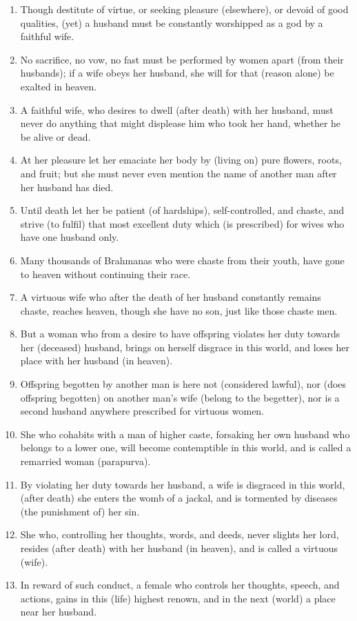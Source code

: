 \begin{enumerate}
\item Though destitute of virtue, or seeking pleasure (elsewhere), or devoid of good qualities, (yet) a husband must be constantly worshipped as a god by a faithful wife.
\item No sacrifice, no vow, no fast must be performed by women apart (from their husbands); if a wife obeys her husband, she will for that (reason alone) be exalted in heaven.
\item A faithful wife, who desires to dwell (after death) with her husband, must never do anything that might displease him who took her hand, whether he be alive or dead.
\item At her pleasure let her emaciate her body by (living on) pure flowers, roots, and fruit; but she must never even mention the name of another man after her husband has died.
\item Until death let her be patient (of hardships), self-controlled, and chaste, and strive (to fulfil) that most excellent duty which (is prescribed) for wives who have one husband only.
\item Many thousands of Brahmanas who were chaste from their youth, have gone to heaven without continuing their race.
\item A virtuous wife who after the death of her husband constantly remains chaste, reaches heaven, though she have no son, just like those chaste men.
\item But a woman who from a desire to have offspring violates her duty towards her (deceased) husband, brings on herself disgrace in this world, and loses her place with her husband (in heaven).
\item Offspring begotten by another man is here not (considered lawful), nor (does offspring begotten) on another man's wife (belong to the begetter), nor is a second husband anywhere prescribed for virtuous women.
\item She who cohabits with a man of higher caste, forsaking her own husband who belongs to a lower one, will become contemptible in this world, and is called a remarried woman (parapurva).
\item By violating her duty towards her husband, a wife is disgraced in this world, (after death) she enters the womb of a jackal, and is tormented by diseases (the punishment of) her sin.
\item She who, controlling her thoughts, words, and deeds, never slights her lord, resides (after death) with her husband (in heaven), and is called a virtuous (wife).
\item In reward of such conduct, a female who controls her thoughts, speech, and actions, gains in this (life) highest renown, and in the next (world) a place near her husband.

\end{enumerate}
